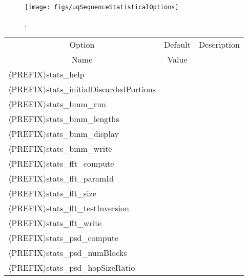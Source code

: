 \begin{figure}[h!]
\centerline{
\texttt{[image: figs/uqSequenceStatisticalOptions]}
}
\caption{
{\color{red}{The sequence statistical options class}}.
}
\label{fig-seq-statistical-options-class}
\end{figure}

\begin{table}[!h]
\begin{center}
\begin{tabular}{|l|c|c|}
\hline
\multicolumn{1}{|c|}{Option}                             & Default & Description \\
\multicolumn{1}{|c|}{Name}                               & Value   &             \\
\hline
\hline
$\langle$PREFIX$\rangle$stats\_help                      &         &             \\
\hline
$\langle$PREFIX$\rangle$stats\_initialDiscardedPortions  &         &             \\
\hline
\hline
$\langle$PREFIX$\rangle$stats\_bmm\_run                   &         &             \\
\hline
$\langle$PREFIX$\rangle$stats\_bmm\_lengths               &         &             \\
\hline
$\langle$PREFIX$\rangle$stats\_bmm\_display               &         &             \\
\hline
$\langle$PREFIX$\rangle$stats\_bmm\_write                 &         &             \\
\hline
\hline
$\langle$PREFIX$\rangle$stats\_fft\_compute               &         &             \\
\hline
$\langle$PREFIX$\rangle$stats\_fft\_paramId               &         &             \\
\hline
$\langle$PREFIX$\rangle$stats\_fft\_size                  &         &             \\
\hline
$\langle$PREFIX$\rangle$stats\_fft\_testInversion         &         &             \\
\hline
$\langle$PREFIX$\rangle$stats\_fft\_write                 &         &             \\
\hline
\hline
$\langle$PREFIX$\rangle$stats\_psd\_compute               &         &             \\
\hline
$\langle$PREFIX$\rangle$stats\_psd\_numBlocks             &         &             \\
\hline
$\langle$PREFIX$\rangle$stats\_psd\_hopSizeRatio          &         &             \\

\end{tabular}
\end{center}
\end{table}
